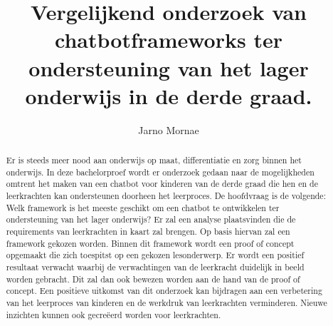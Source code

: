 \documentclass{hogent-article}
\title{Vergelijkend onderzoek van chatbotframeworks ter ondersteuning van het lager onderwijs in de derde graad.}
\author{Jarno Mornae}
\begin{document}
\begin{abstract}

  Er is steeds meer nood aan onderwijs op maat, differentiatie en zorg binnen het onderwijs. 
  In deze bachelorproef wordt er onderzoek gedaan naar de mogelijkheden omtrent het maken van een chatbot voor kinderen van de derde graad die hen en de leerkrachten kan ondersteunen doorheen het leerproces. De hoofdvraag is de volgende: Welk framework is het meeste geschikt om een chatbot te ontwikkelen ter ondersteuning van het lager onderwijs? Er zal een analyse plaatsvinden die de requirements van leerkrachten in kaart zal brengen. Op basis hiervan zal een framework gekozen worden. Binnen dit framework wordt een proof of concept opgemaakt die zich toespitst op een gekozen lesonderwerp. Er wordt een positief resultaat verwacht waarbij de verwachtingen van de leerkracht duidelijk in beeld worden gebracht. Dit zal dan ook bewezen worden aan de hand van de proof of concept. Een positieve uitkomst van dit onderzoek kan bijdragen aan een verbetering van het leerproces van kinderen en de werkdruk van leerkrachten verminderen. Nieuwe inzichten kunnen ook gecreëerd worden voor leerkrachten. 
\end{abstract}

\tableofcontents



\printbibliography[heading=bibintoc]
\end{document}
